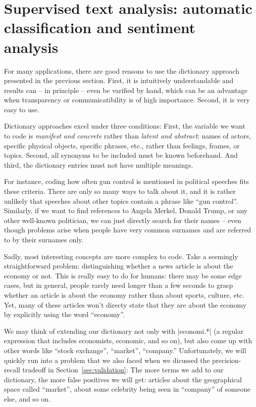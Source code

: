 \section{Supervised text analysis: automatic classification and sentiment analysis}
\label{sec:supervised}

For many applications, there are good reasons to use the dictionary
approach presented in the previous section. First, it is intuitively
understandable and results can -- in principle --
even be varified by hand, which can be an advantage when transparency
or communicatibility is of high importance. Second, it is very easy to
use.

Dictionary approaches excel under three conditions: First, the
variable we want to code is \emph{manifest and concrete} rather than
\emph{latent and abstract}: names of actors, specific physical
objects, specific phrases, etc., rather than feelings, frames, or
topics. Second, all synonyms to be included must be known
beforehand. And third, the dictionary entries must not have multiple
meanings.

For instance, coding how often gun control is mentioned in political
speeches fits these criteria. There are only so many ways to talk
about it, and it is rather unlikely that speeches about other topics
contain a phrase like ``gun control''. Similarly, if we want to find
references to Angela Merkel, Donald Trump, or any other well-known
politician, we can just directly search for their names -- even though
problems arise when people have very common surnames and are referred
to by their surnames only.

Sadly, most interesting concepts are more complex to code. Take a
seemingly straightforward problem: distinguishing whether a news
article is about the economy or not. This is really easy to do for
humans: there may be some edge cases, but in general, people rarely
need longer than a few seconds to grasp whether an article is about the
economy rather than about sports, culture, etc. Yet, many of these
articles won't directy state that they are about the economy by
explicitly using the word ``economy''.

We may think of extending our dictionary not only with |economi.*| (a
regular expression that includes economists, economic, and so on), but
also come up with other words like ``stock exchange'', ``market'',
``company.'' Unfortunately, we will quickly run into a problem that we also
faced when we dicussed the precision-recall tradeoff in
Section~\ref{sec:validation}: The more terms we add to our
dictionary, the more false positives we will get: articles about
the geographical space called ``market'', about some celebrity being seen
in ``company'' of someone else, and so on.


